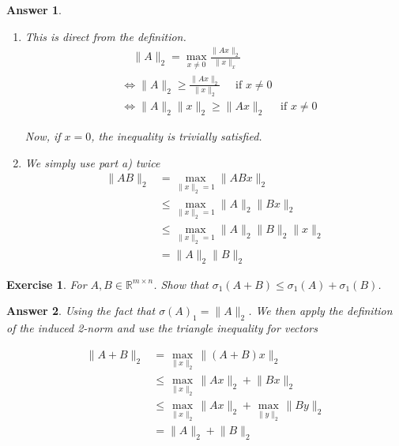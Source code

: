 \documentclass[12pt]{article}
\theoremstyle{colon}
\newtheorem{exercise}{Exercise}
\newtheorem*{answer}{Answer}
\begin{document}
\begin{answer}
  \

  \begin{enumerate}[label=\alph*)]
    \item This is direct from the definition.
      \begin{align*}
        &\quad \lVert A \rVert_2 = \max_{x \neq 0} \frac{\lVert A x \rVert_2}{\lVert x \rVert_x} \\
        &\Longleftrightarrow \lVert A \rVert_2 \geq \frac{\lVert A x \rVert_2}{\lVert x \rVert_2} \quad \text{ if } x \neq 0 \\
        &\Longleftrightarrow \lVert A \rVert_2 \lVert x \rVert_2 \geq \lVert A x \rVert_2 \quad \text{ if } x \neq 0
      \end{align*}

      Now, if $x = 0$, the inequality is trivially satisfied.

    \item We simply use part a) twice
      \begin{align*}
        \lVert AB \rVert_2 &= \max_{\lVert x \rVert_2 = 1} \lVert A Bx \rVert_2 \\
        &\leq \max_{\lVert x \rVert_2 = 1} \lVert A \rVert_2 \lVert Bx \rVert_2 \\
        &\leq \max_{\lVert x \rVert_2 = 1} \lVert A \rVert_2 \lVert B \rVert_2 \lVert x \rVert_2 \\
        &= \lVert A \rVert_2 \lVert B \rVert_2
      \end{align*}
  \end{enumerate}
\end{answer}

\clearpage

\begin{exercise}
  For $A, B \in \mathbb{R}^{m \times n}$. Show that $\sigma_1 (A + B) \leq \sigma_1 (A) + \sigma_1 (B)$.
\end{exercise}

\begin{answer}
   Using the fact that $\sigma(A)_1 = \lVert A \rVert_2$. We then apply the definition of the induced 2-norm and use the triangle inequality for vectors

   \begin{align*}
    \lVert A + B \rVert_2 &= \max_{\lVert x \rVert_2} \lVert (A+B)x \rVert_2 \\
    &\leq \max_{\lVert x \rVert_2} \lVert Ax \rVert_2 + \lVert Bx \rVert_2 \\
    &\leq \max_{\lVert x \rVert_2} \lVert Ax \rVert_2 + \max_{\lVert y \rVert_2} \lVert By \rVert_2 \\
    &= \lVert A \rVert_2 + \lVert B \rVert_2
   \end{align*}
\end{answer}
\end{document}
